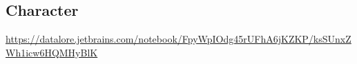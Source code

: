 \documentclass[]{scrartcl}
\begin{document}
\subsection*{Character}
\url{https://datalore.jetbrains.com/notebook/FpyWpIOdg45rUFhA6jKZKP/ksSUnxZWh1icw6HQMHyBlK}
%
%
%
%
%
%
%
%
%
\end{document}
